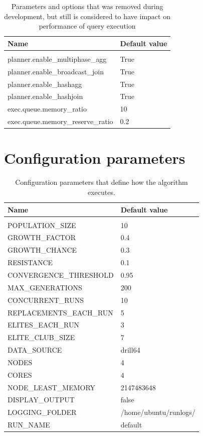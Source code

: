\documentclass[a4paper,english]{report}
\begin{document}
\begin{table}[H]
	\centering
	\caption{Parameters and options that was removed during development, but still is considered to have impact on performance of query execution}
	\label{table:removed_params}
	\begin{tabular}{ll}
		\\
		\multicolumn{1}{l}{\bfseries Name} & \multicolumn{1}{l}{\bfseries Default value} \\ \hline \\
		planner.enable\_multiphase\_agg & True  \\
		planner.enable\_broadcast\_join & True  \\
		planner.enable\_hashagg & True  \\
		planner.enable\_hashjoin & True  \\
		exec.queue.memory\_ratio & 10  \\ 
		exec.queue.memory\_reserve\_ratio & 0.2  \\
	\end{tabular}
\end{table}

\chapter{Configuration parameters}
\begin{table}[H]
	\centering
	\caption{Configuration parameters that define how the algorithm executes.}
	\label{table:conf_params}
	\begin{tabular}{ll}
		\\
		\multicolumn{1}{l}{\bfseries Name} & \multicolumn{1}{l}{\bfseries Default value} \\ \hline \\
			POPULATION\_SIZE& 10 \\
			GROWTH\_FACTOR & 0.4 \\
			GROWTH\_CHANCE & 0.3 \\
			RESISTANCE & 0.1 \\
			
			CONVERGENCE\_THRESHOLD & 0.95 \\
			MAX\_GENERATIONS & 200 \\
			CONCURRENT\_RUNS & 10 \\
			
			REPLACEMENTS\_EACH\_RUN & 5 \\
			ELITES\_EACH\_RUN & 3 \\
			ELITE\_CLUB\_SIZE & 7 \\
			
			DATA\_SOURCE & drill64 \\
			NODES & 4 \\
			CORES & 4 \\
			NODE\_LEAST\_MEMORY & 2147483648 \\
			
			DISPLAY\_OUTPUT & false \\
			LOGGING\_FOLDER & /home/ubuntu/runlogs/ \\
			RUN\_NAME & default \\
	\end{tabular}
\end{table}
\end{document}
